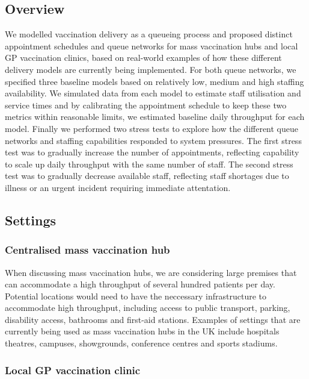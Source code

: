 \documentclass{article}
\begin{document}
\hypertarget{overview}{%
\subsection{Overview}\label{overview}}

We modelled vaccination delivery as a queueing process and proposed
distinct appointment schedules and queue networks for mass vaccination
hubs and local GP vaccination clinics, based on real-world examples of
how these different delivery models are currently being implemented. For
both queue networks, we specified three baseline models based on
relatively low, medium and high staffing availability. We simulated data
from each model to estimate staff utilisation and service times and by
calibrating the appointment schedule to keep these two metrics within
reasonable limits, we estimated baseline daily throughput for each
model. Finally we performed two stress tests to explore how the
different queue networks and staffing capabilities responded to system
pressures. The first stress test was to gradually increase the number of
appointments, reflecting capability to scale up daily throughput with
the same number of staff. The second stress test was to gradually
decrease available staff, reflecting staff shortages due to illness or
an urgent incident requiring immediate attentation.

\hypertarget{settings}{%
\subsection{Settings}\label{settings}}

\hypertarget{centralised-mass-vaccination-hub}{%
\subsubsection{Centralised mass vaccination
hub}\label{centralised-mass-vaccination-hub}}

When discussing mass vaccination hubs, we are considering large premises
that can accommodate a high throughput of several hundred patients per
day. Potential locations would need to have the neccessary
infrastructure to accommodate high throughput, including access to
public transport, parking, disability access, bathrooms and first-aid
stations. Examples of settings that are currently being used as mass
vaccination hubs in the UK include hospitals theatres, campuses,
showgrounds, conference centres and sports stadiums.

\hypertarget{local-gp-vaccination-clinic}{%
\subsubsection{Local GP vaccination
clinic}\label{local-gp-vaccination-clinic}}
\end{document}
